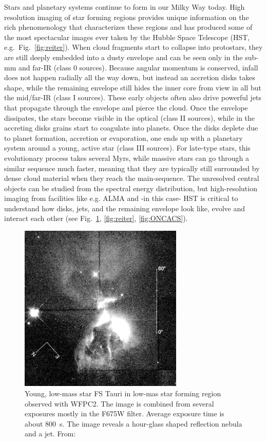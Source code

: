 \documentclass[12pt]{article}
\begin{document}
%
%
\justification          %
Stars and planetary systems continue to form in our Milky Way today. High resolution imaging of star forming regions provides unique information on the rich phenomenology that characterizes these regions and has produced some of the most spectacular images ever taken by
the Hubble Space Telescope (HST, e.g.\ Fig.~\ref{fig:reiter}).
When cloud fragments start to collapse into protostars, they are still deeply
embedded into a dusty envelope and can be seen only in the sub-mm and far-IR (class
0 sources). Because angular momentum is conserved, infall does not happen
radially all the way down, but instead an accretion disks takes shape, while
the remaining envelope still hides the inner core from view in all but the
mid/far-IR (class I sources).  These early objects often also drive powerful jets
that propagate through the envelope and pierce the cloud. Once the envelope
dissipates, the stars become visible in the optical  (class II sources), while in the  accreting disks grains start to coagulate
into planets. Once the disks deplete due to planet formation, accretion or
evaporation, one ends up with a planetary system around a young, active star
(class III sources). For late-type stars, this evolutionary process takes several Myrs,
while massive stars can go through a similar sequence much faster, meaning that
they are typically still surrounded by dense cloud material when they reach the main-sequence.
The unresolved central objects can be studied from the spectral energy distribution, but
high-resolution imaging from facilities like e.g. ALMA and -in this case- HST  is critical to understand how disks, jets, and the remaining envelope
look like, evolve and interact each other (see Fig.~\ref{fig:krist}, \ref{fig:reiter},  \ref{fig:ONCACS}).


\begin{figure}
    \centering
    \includegraphics[height=8cm]{Krist98.png}
    \caption{Young, low-mass star FS Tauri in low-mas star forming region observed with WFPC2. The image is combined from several exposures mostly in the F675W filter. Average exposure time is about 800~s. The image reveals a hour-glass shaped reflection nebula and a jet. From: \citet{1998ApJ...501..841K}}
    \label{fig:krist}
\end{figure}
\end{document}
